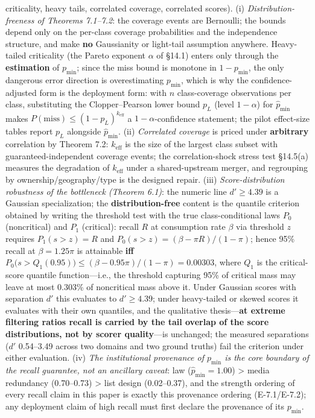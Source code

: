 \documentclass[
  11pt]{article}
\begin{document}
\begin{enumerate}
{  criticality, heavy tails, correlated coverage, correlated scores)}.
  (i) \emph{Distribution-freeness of Theorems 7.1--7.2}: the coverage
  events are Bernoulli; the bounds depend only on the per-class coverage
  probabilities and the independence structure, and make \textbf{no}
  Gaussianity or light-tail assumption anywhere. Heavy-tailed
  criticality (the Pareto exponent \(\alpha\) of §14.1) enters only
  through the \textbf{estimation} of \(p_{\min}\); since the miss bound
  is monotone in \(1-p_{\min}\), the only dangerous error direction is
  overestimating \(p_{\min}\), which is why the confidence-adjusted form
  is the deployment form: with \(n\) class-coverage observations per
  class, substituting the Clopper--Pearson lower bound \(p_L\) (level
  \(1-\alpha\)) for \(\hat p_{\min}\) makes
  \(P(\mathrm{miss}) \le (1-p_L)^{k_{\mathrm{eff}}}\) a
  \(1-\alpha\)-confidence statement; the pilot effect-size tables report
  \(p_L\) alongside \(\hat p_{\min}\). (ii) \emph{Correlated coverage}
  is priced under \textbf{arbitrary} correlation by Theorem 7.2:
  \(k_{\mathrm{eff}}\) is the size of the largest class subset with
  guaranteed-independent coverage events; the correlation-shock stress
  test §14.5(a) measures the degradation of \(k_{\mathrm{eff}}\) under a
  shared-upstream merger, and regrouping by ownership/geography/type is
  the designed repair. (iii) \emph{Score-distribution robustness of the
  bottleneck (Theorem 6.1)}: the numeric line \(d' \ge 4.39\) is a
  Gaussian specialization; the \textbf{distribution-free} content is the
  quantile criterion obtained by writing the threshold test with the
  true class-conditional laws \(P_0\) (noncritical) and \(P_1\)
  (critical): recall \(R\) at consumption rate \(\beta\) via threshold
  \(z\) requires \(P_1(s > z) = R\) and
  \(P_0(s > z) = (\beta - \pi R)/(1-\pi)\); hence 95\% recall at
  \(\beta = 1.25\pi\) is attainable \textbf{iff}
  \(P_0\big(s > Q_1(0.95)\big) \le (\beta - 0.95\pi)/(1-\pi) = 0.00303\),
  where \(Q_1\) is the critical-score quantile function---i.e., the
  threshold capturing 95\% of critical mass may leave at most 0.303\% of
  noncritical mass above it. Under Gaussian scores with separation
  \(d'\) this evaluates to \(d' \ge 4.39\); under heavy-tailed or skewed
  scores it evaluates with their own quantiles, and the qualitative
  thesis---\textbf{at extreme filtering ratios recall is carried by the
  tail overlap of the score distributions, not by scorer quality}---is
  unchanged; the measured separations (\(d'\) 0.54--3.49 across two
  domains and two ground truths) fail the criterion under either
  evaluation. (iv) \emph{The institutional provenance of \(p_{\min}\) is
  the core boundary of the recall guarantee, not an ancillary caveat}:
  law (\(\hat p_{\min}=1.00\)) \textgreater{} media redundancy
  (0.70--0.73) \textgreater{} list design (0.02--0.37), and the strength
  ordering of every recall claim in this paper is exactly this
  provenance ordering (E-7.1/E-7.2); any deployment claim of high recall
  must first declare the provenance of its \(p_{\min}\).
\end{enumerate}
\end{document}
